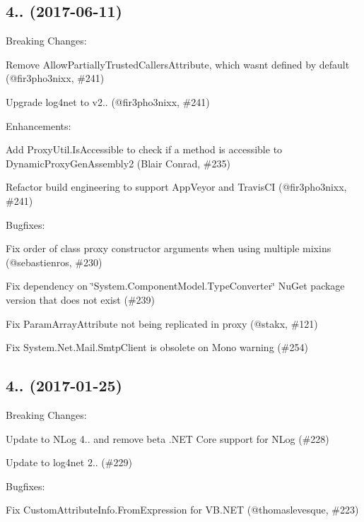 \subsection*{4.. (2017-\/06-\/11)}

Breaking Changes\+:
\begin{DoxyItemize}
\item Remove Allow\+Partially\+Trusted\+Callers\+Attribute, which wasn\textquotesingle{}t defined by default (@fir3pho3nixx, \#241)
\item Upgrade log4net to v2.. (@fir3pho3nixx, \#241)
\end{DoxyItemize}

Enhancements\+:
\begin{DoxyItemize}
\item Add Proxy\+Util.\+Is\+Accessible to check if a method is accessible to Dynamic\+Proxy\+Gen\+Assembly2 (Blair Conrad, \#235)
\item Refactor build engineering to support App\+Veyor and Travis\+CI (@fir3pho3nixx, \#241)
\end{DoxyItemize}

Bugfixes\+:
\begin{DoxyItemize}
\item Fix order of class proxy constructor arguments when using multiple mixins (@sebastienros, \#230)
\item Fix dependency on \char`\"{}\+System.\+Component\+Model.\+Type\+Converter\char`\"{} Nu\+Get package version that does not exist (\#239)
\item Fix Param\+Array\+Attribute not being replicated in proxy (@stakx, \#121)
\item Fix System.\+Net.\+Mail.\+Smtp\+Client is obsolete on Mono warning (\#254)
\end{DoxyItemize}

\subsection*{4.. (2017-\/01-\/25)}

Breaking Changes\+:
\begin{DoxyItemize}
\item Update to N\+Log 4.. and remove beta .N\+ET Core support for N\+Log (\#228)
\item Update to log4net 2.. (\#229)
\end{DoxyItemize}

Bugfixes\+:
\begin{DoxyItemize}
\item Fix Custom\+Attribute\+Info.\+From\+Expression for V\+B.\+N\+ET (@thomaslevesque, \#223)
\end{DoxyItemize}


